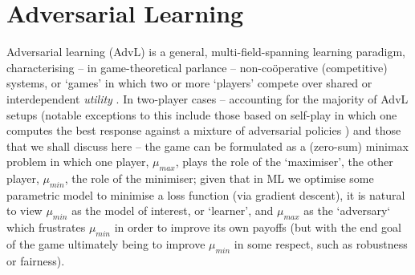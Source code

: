 \section{Adversarial Learning}\label{sec:adv-learning}
Adversarial learning (AdvL) is a general, multi-field-spanning learning paradigm, characterising --
in game-theoretical parlance -- non-co{\"o}perative (competitive) systems, or `games' in which
two or more `players' compete over shared or interdependent
\emph{utility} \citep{fudenberg1991game}.
%
%
In two-player cases -- accounting for the majority of AdvL setups (notable exceptions to this
include those based on self-play in which one computes the best response against a mixture of
adversarial policies \citep{silver2017mastering, vinyals2019grandmaster}) and those that we shall
discuss here -- the game can be formulated as a (zero-sum) minimax problem in which one player,
\(\mu_{max}\), plays the role of the `maximiser', the other player, \(\mu_{min}\), the role of the
minimiser; given that in ML we optimise some parametric model to minimise a loss function (via
gradient descent), it is natural to view \(\mu_{min}\) as the model of interest, or `learner', and
\(\mu_{max}\) as the `adversary` which frustrates \(\mu_{min}\) in order to improve its own payoffs
(but with the end goal of the game ultimately being to improve \(\mu_{min}\) in some respect, such
as robustness or fairness).
%

